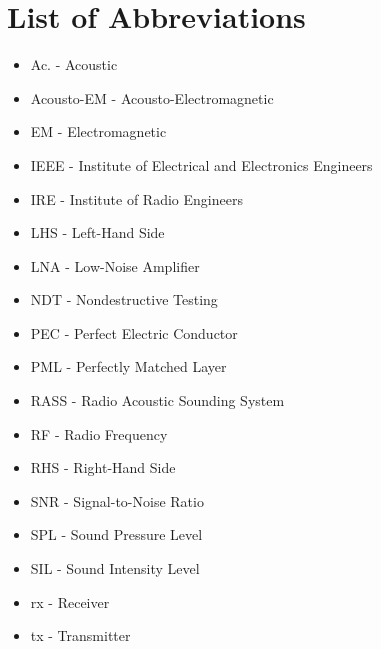 \documentclass[11pt,twoside]{eitExjobb}
\begin{document}
	\chapter*{List of Abbreviations}
	\begin{itemize}
		\item Ac. - Acoustic
		\item Acousto-EM - Acousto-Electromagnetic
		\item EM - Electromagnetic
		\item IEEE - Institute of Electrical and Electronics Engineers
		\item IRE - Institute of Radio Engineers
		\item LHS - Left-Hand Side
		\item LNA - Low-Noise Amplifier
		\item NDT - Nondestructive Testing
		\item PEC - Perfect Electric Conductor
		\item PML - Perfectly Matched Layer
		\item RASS - Radio Acoustic Sounding System
		\item RF - Radio Frequency
		\item RHS - Right-Hand Side
		\item SNR - Signal-to-Noise Ratio
		\item SPL - Sound Pressure Level
		\item SIL - Sound Intensity Level
		\item rx - Receiver
		\item tx - Transmitter
	\end{itemize}
	
\end{document}
